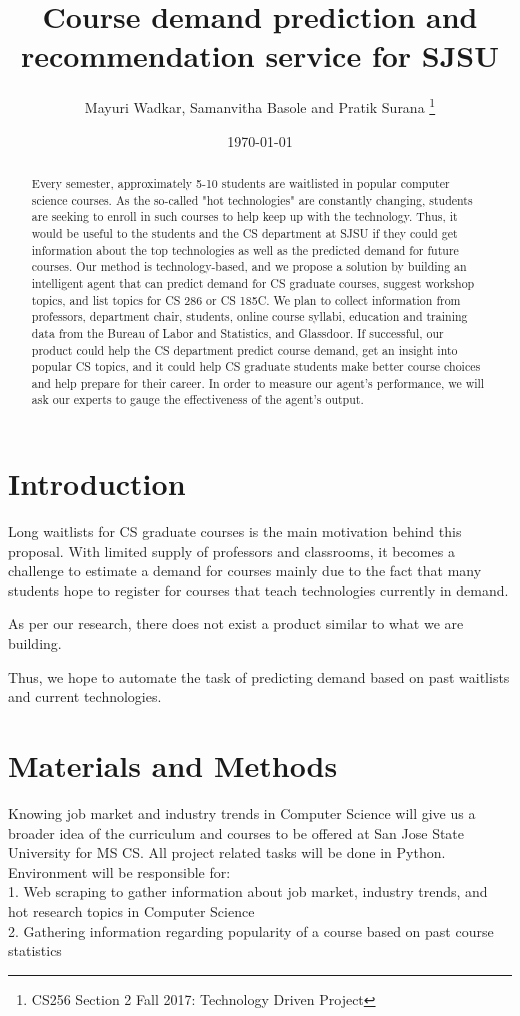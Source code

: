 \documentclass{article}
\title{Course demand prediction and recommendation service for SJSU}
\author{Mayuri Wadkar, Samanvitha Basole and Pratik Surana
\thanks{CS256 Section 2 Fall 2017: Technology Driven Project}}
\date{\today}
\begin{document}
\maketitle
\begin{abstract}
Every semester, approximately 5-10 students are waitlisted in popular computer science courses. As the so-called "hot technologies" are constantly changing, students are seeking to enroll in such courses to help keep up with the technology. Thus, it would be useful to the students and the CS department at SJSU if they could get information about the top technologies as well as the predicted demand for future courses. Our method is technology-based, and we propose a solution by building an intelligent agent that can predict demand for CS graduate courses, suggest workshop topics, and list topics for CS 286 or CS 185C. We plan to collect information from professors, department chair, students, online course syllabi, education and training data from the Bureau of Labor and Statistics, and Glassdoor. If successful, our product could help the CS department predict course demand, get an insight into popular CS topics, and it could help CS graduate students make better course choices and help prepare for their career. In order to measure our agent's performance, we will ask our experts to gauge the effectiveness of the agent's output. 
\end{abstract}

\section{Introduction}

Long waitlists for CS graduate courses is the main motivation behind this proposal. With limited supply of professors and classrooms, it becomes a challenge to estimate a demand for courses mainly due to the fact that many students hope to register for courses that teach technologies currently in demand. 

As per our research, there does not exist a product similar to what we are building. 

Thus, we hope to automate the task of predicting demand based on past waitlists and current technologies. 


\section{Materials and Methods}
Knowing job market and industry trends in Computer Science will give us a broader idea of the curriculum and courses to be offered at San Jose State University for MS CS. All project related tasks will be done in Python. \\
Environment will be responsible for: \\
1. Web scraping to gather information about job market, industry trends, and hot research topics in Computer Science \cite{mitchell2015web}\\
2. Gathering information regarding popularity of a course based on past course statistics \cite{robert2009introduction} \\
\end{document}
